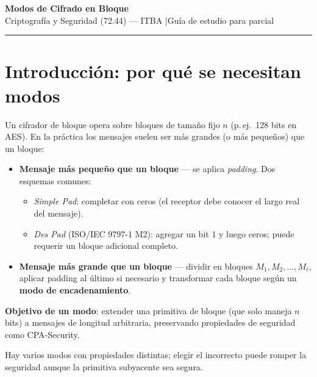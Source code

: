 \documentclass[11pt,a4paper]{article}
\begin{document}
\begin{center}
  {\Large\bfseries\color{mainblue} Modos de Cifrado en Bloque}\\[4pt]
  {\normalsize Criptograf\'ia y Seguridad (72.44) --- ITBA \quad|\quad Gu\'ia de estudio para parcial}
\end{center}
\vspace{-4pt}
\hrule
\vspace{8pt}

\section{Introducci\'on: por qu\'e se necesitan modos}

Un cifrador de bloque opera sobre bloques de tama\~no fijo $n$ (p.\,ej.\ 128
bits en AES). En la pr\'actica los mensajes suelen ser m\'as grandes (o m\'as
peque\~nos) que un bloque:

\begin{itemize}[nosep]
  \item \textbf{Mensaje m\'as peque\~no que un bloque} --- se aplica
    \emph{padding}. Dos esquemas comunes:
    \begin{itemize}[nosep]
      \item \emph{Simple Pad}: completar con ceros (el receptor debe conocer
        el largo real del mensaje).
      \item \emph{Des Pad} (ISO/IEC 9797-1 M2): agregar un bit 1 y luego
        ceros; puede requerir un bloque adicional completo.
    \end{itemize}
  \item \textbf{Mensaje m\'as grande que un bloque} --- dividir en bloques
    $M_1, M_2, \ldots, M_\ell$, aplicar padding al \'ultimo si necesario y
    transformar cada bloque seg\'un un \textbf{modo de encadenamiento}.
\end{itemize}

\begin{destacado}
  \textbf{Objetivo de un modo}: extender una primitiva de bloque (que solo
  maneja $n$ bits) a mensajes de longitud arbitraria, preservando propiedades
  de seguridad como CPA-Security.
\end{destacado}

Hay varios modos con propiedades distintas; elegir el incorrecto puede romper
la seguridad aunque la primitiva subyacente sea segura.

\end{document}
